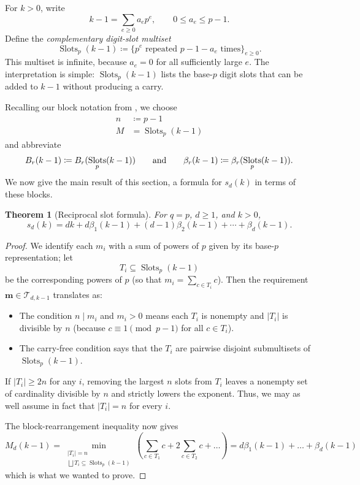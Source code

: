 \documentclass[11pt]{amsart}
\newtheorem{theorem}{Theorem}[section]
\theoremstyle{definition}
\newcommand{\Tdk}{\mathcal{T}_{d,k-1}}
\DeclareMathOperator{\Slots}{Slots}
\begin{document}
For $k>0$, write
\[ k-1=\sum_{e\geq 0}a_ep^e, \qquad 0\leq a_e\leq p-1.  \]
Define the \emph{complementary digit-slot multiset}
\begin{equation}\label{eq:H2-Ak}
  \Slots_p(k-1) \coloneq \{p^e\text{ repeated }p-1-a_e\text{ times}\}_{e\geq 0}.
\end{equation}
This multiset is infinite, because $a_e=0$ for all sufficiently large $e$.
The interpretation is simple:
$\Slots_p(k-1)$ lists the base-$p$ digit slots that can be added to $k-1$ without producing a carry.

Recalling our block notation from , we choose
\begin{align*}
  n &\coloneq p-1 \\
  M &= \Slots_p(k-1)
\end{align*}
and abbreviate
\[
  B_r(k-1) \coloneq B_r(\Slots_p(k-1))\qquad {\text {\rm and}}\qquad \beta_r(k-1) \coloneq \beta_r(\Slots_p(k-1)).
\]
We now give the main result of this section,
a formula for $s_d(k)$ in terms of these blocks.
\begin{theorem}[Reciprocal slot formula]\label{thm:H2-slot-formula}
For $q=p$, $d\geq 1$, and $k>0$,
\begin{equation}\label{eq:H2-slot-formula}
  s_d(k)=dk+d\beta_1(k-1)+(d-1)\beta_2(k-1)+\cdots+\beta_d(k-1).
\end{equation}
\end{theorem}

\begin{proof}
  We identify each $m_i$ with a sum of powers of $p$ given by its base-$p$ representation;
  let \[ T_i \subseteq \Slots_p(k-1) \] be the corresponding powers of $p$
  (so that $m_i = \sum_{c \in T_i} c$).
  Then the requirement $\mathbf{m} \in \Tdk$ translates as:
  \begin{itemize}
    \item The condition $n \mid m_i$ and $m_i > 0$
      means each $T_i$ is nonempty and $|T_i|$ is divisible by $n$
      (because $c \equiv 1 \pmod{p-1}$ for all $c \in T_i$).
    \item The carry-free condition says that the $T_i$ are pairwise
      disjoint submultisets of $\Slots_p(k-1)$.
  \end{itemize}
  If $|T_i|\geq 2n$ for any $i$, removing the largest $n$ slots from $T_i$
  leaves a nonempty set of cardinality divisible by $n$ and strictly lowers the exponent.
  Thus, we may as well assume in fact that $|T_i| = n$ for every $i$.

  The block-rearrangement inequality  now gives
  \[ M_d(k-1) = \min_{\substack{|T_i|=n \\ \bigsqcup T_i \subseteq \Slots_p(k-1)}}
    \left( \sum_{c \in T_1} c + 2 \sum_{c \in T_2} c + \dots
    \right) = d\beta_1(k-1)+\dots+\beta_d(k-1) \]
  which is what we wanted to prove.
\end{proof}
\end{document}
